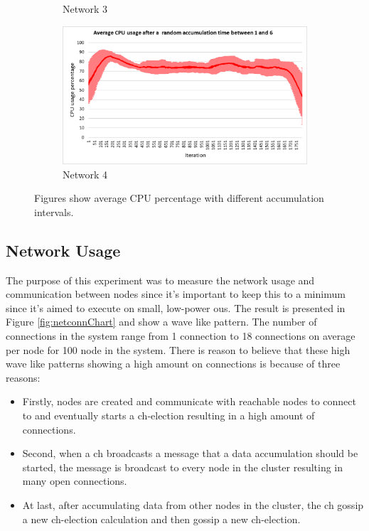 \documentclass[USenglish]{uit-thesis}
\begin{document}
\begin{figure}
\begin{subfigure}[b]{0.475\textwidth}
            \caption[]%
            {{\small Network 3}}    
            \label{fig:cpufig3}
        \end{subfigure}
        \quad
        \begin{subfigure}[b]{0.475\textwidth}   
            \centering 
            \includegraphics[width=\textwidth]{CPU_stdev_rand.png}
            \caption[]%
            {{\small Network 4}}    
            \label{fig:cpufig4}
        \end{subfigure}
        \caption[Figures show average CPU percentage with different accumulation intervals.]
        {\small Figures show average CPU percentage with different accumulation intervals.} 
        \label{fig:cpuChart}
    \end{figure}



\newpage

\subsection{Network Usage}
The purpose of this experiment was to measure the network usage and communication between nodes since it's important to keep this to a minimum since it's aimed to execute on small, low-power \glspl{ou}. The result is presented in Figure \ref{fig:netconnChart} and show a wave like pattern. The number of connections in the system range from 1 connection to 18 connections on average per node for 100 node in the system.
There is reason to believe that these high wave like patterns showing a high amount on connections is because of three reasons:

\begin{itemize}
\item Firstly, nodes are created and communicate with reachable nodes to connect to and eventually starts a \gls{ch}-election resulting in a high amount of connections.
\item Second, when a \gls{ch} broadcasts a message that a data accumulation should be started, the message is broadcast to every node in the cluster resulting in many open connections.
\item At last, after accumulating data from other nodes in the cluster, the \gls{ch} gossip a new \gls{ch}-election calculation and then gossip a new \gls{ch}-election.
\end{itemize}
\end{document}
